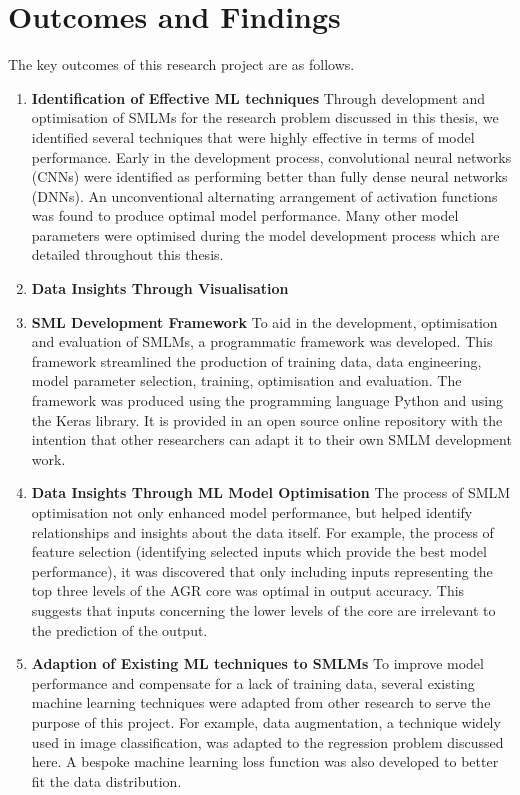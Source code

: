 \section{Outcomes and Findings}

The key outcomes of this research project are as follows.

\begin{enumerate}
	\item \textbf{Identification of Effective ML techniques}
	Through development and optimisation of SMLMs for the research problem discussed in this thesis, we identified several techniques that were  highly effective in terms of model performance. Early in the development process, convolutional neural networks (CNNs) were identified as performing better than fully dense neural networks (DNNs). An unconventional alternating arrangement of activation functions was found to produce optimal model performance. Many other model parameters were optimised during the model development process which are detailed throughout this thesis.
	
	
	\item \textbf{Data Insights Through Visualisation}
	
	
	\item \textbf{SML Development Framework}  To aid in the development, optimisation and evaluation of SMLMs, a programmatic framework was developed. This framework streamlined the production of training data, data engineering, model parameter selection, training, optimisation and evaluation. The framework was produced using the programming language Python and using the Keras library. It is provided in an open source online repository with the intention that other researchers can adapt it to their own SMLM development work.
	 
	\item \textbf{Data Insights Through ML Model Optimisation}
	The process of SMLM optimisation not only enhanced model performance, but helped identify relationships and insights about the data itself. For example, the process of feature selection (identifying selected inputs which provide the best model performance), it was discovered that only including inputs representing the top three levels of the AGR core was optimal in output accuracy. This suggests that inputs concerning the lower levels of the core are irrelevant to the prediction of the output.  
	
	\item \textbf{Adaption of Existing ML techniques to SMLMs}
	To improve model performance and compensate for a lack of training data, several existing machine learning techniques were adapted from other research to serve the purpose of this project. For example, data augmentation, a technique widely used in image classification, was adapted to the regression problem discussed here. A bespoke machine learning loss function was also developed to better fit the data distribution. 
	
	
\end{enumerate}

